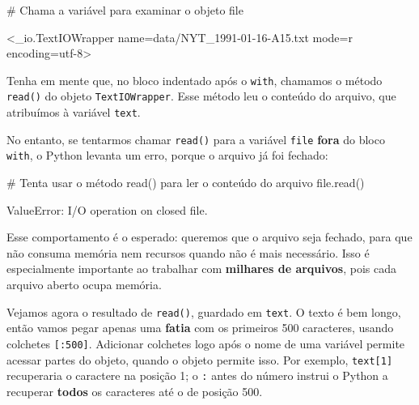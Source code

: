 \documentclass[
  brazilian,
  11pt,
]{article}
\newenvironment{Shaded}{\begin{snugshade}}{\end{snugshade}}
\newcommand{\BuiltInTok}[1]{\textcolor[rgb]{0.50,0.55,0.55}{#1}}
\newcommand{\CommentTok}[1]{\textcolor[rgb]{0.48,0.49,0.49}{#1}}
\newcommand{\NormalTok}[1]{\textcolor[rgb]{0.81,0.81,0.76}{#1}}
\let\oldtexttt\texttt
\renewcommand{\texttt}[1]{{\color{inlink}\oldtexttt{#1}}}
\begin{document}
\begin{Shaded}
\begin{Highlighting}[]
\CommentTok{\# Chama a variável para examinar o objeto}
\BuiltInTok{file}
\end{Highlighting}
\end{Shaded}

\begin{Shaded}
\begin{Highlighting}[]
\NormalTok{\textless{}\_io.TextIOWrapper name=\textquotesingle{}data/NYT\_1991{-}01{-}16{-}A15.txt\textquotesingle{} mode=\textquotesingle{}r\textquotesingle{} encoding=\textquotesingle{}utf{-}8\textquotesingle{}\textgreater{}}
\end{Highlighting}
\end{Shaded}

Tenha em mente que, no bloco indentado após o \texttt{with}, chamamos o
método \texttt{read()} do objeto \texttt{TextIOWrapper}. Esse método leu
o conteúdo do arquivo, que atribuímos à variável \texttt{text}.

No entanto, se tentarmos chamar \texttt{read()} para a variável
\texttt{file} \textbf{fora} do bloco \texttt{with}, o Python levanta um
erro, porque o arquivo já foi fechado:

\begin{Shaded}
\begin{Highlighting}[]
\CommentTok{\# Tenta usar o método read() para ler o conteúdo do arquivo}
\BuiltInTok{file}\NormalTok{.read()}
\end{Highlighting}
\end{Shaded}

\begin{Shaded}
\begin{Highlighting}[]
\NormalTok{ValueError: I/O operation on closed file.}
\end{Highlighting}
\end{Shaded}

Esse comportamento é o esperado: queremos que o arquivo seja fechado,
para que não consuma memória nem recursos quando não é mais necessário.
Isso é especialmente importante ao trabalhar com \textbf{milhares de
arquivos}, pois cada arquivo aberto ocupa memória.

Vejamos agora o resultado de \texttt{read()}, guardado em \texttt{text}.
O texto é bem longo, então vamos pegar apenas uma \textbf{fatia} com os
primeiros 500 caracteres, usando colchetes \texttt{{[}:500{]}}.
Adicionar colchetes logo após o nome de uma variável permite acessar
partes do objeto, quando o objeto permite isso. Por exemplo,
\texttt{text{[}1{]}} recuperaria o caractere na posição 1; o \texttt{:}
antes do número instrui o Python a recuperar \textbf{todos} os
caracteres até o de posição 500.
\end{document}
